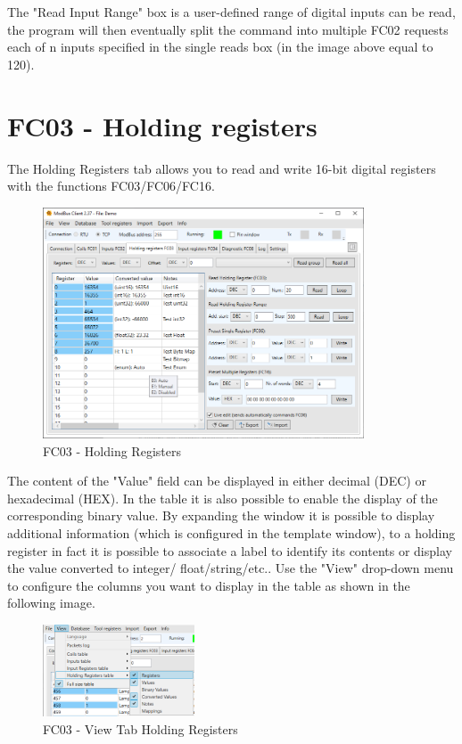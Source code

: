 The "Read Input Range" box is a user-defined range of digital inputs can be read,
the program will then eventually split the command into multiple FC02 requests
each of n inputs specified in the single reads box (in the image above equal to 120).

\newpage
\section{FC03 - Holding registers}

The Holding Registers tab allows you to read and write 16-bit digital 
registers with the functions
FC03/FC06/FC16.

\begin{figure}[H]
\centering
\includegraphics[width=0.85\textwidth]{../Img/Modbus_Client_HoldingReg_00.PNG}
\caption{FC03 - Holding Registers}
\end{figure}

The content of the "Value" field can be displayed in either decimal (DEC) or hexadecimal
(HEX). In the table it is also possible to enable the display of the 
corresponding binary value.
By expanding the window it is possible to display additional information (which is configured
in the template window), to a holding register in fact it is possible to
associate a label to identify its contents or display the value converted to integer/
float/string/etc.. Use the "View" drop-down menu to configure the columns you want to display
in the table as shown in the following image.

\begin{figure}[H]
\centering
\includegraphics[width=0.40\textwidth]{../Img/Menu_View_Holding.PNG}
\caption{FC03 - View Tab Holding Registers}
\end{figure}

